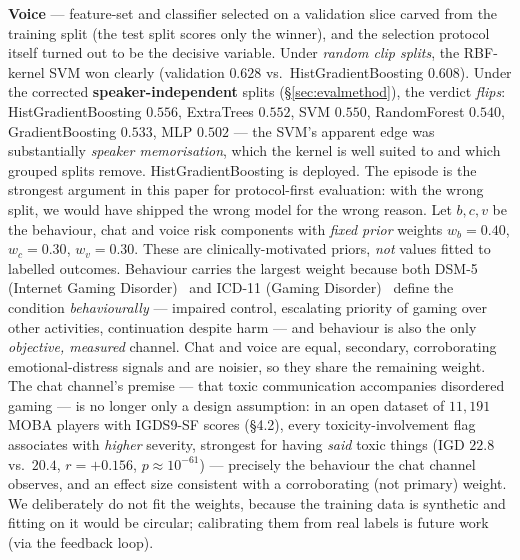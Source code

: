 \documentclass[11pt,a4paper]{article}
\begin{document}
\textbf{Voice} --- feature-set and classifier selected on a validation slice carved
from the training split (the test split scores only the winner), and the selection
protocol itself turned out to be the decisive variable. Under \emph{random clip
splits}, the RBF-kernel SVM won clearly (validation $0.628$ vs.\ HistGradientBoosting
$0.608$). Under the corrected \textbf{speaker-independent} splits
(\S\ref{sec:evalmethod}), the verdict \emph{flips}: HistGradientBoosting $0.556$,
ExtraTrees $0.552$, SVM $0.550$, RandomForest $0.540$, GradientBoosting $0.533$,
MLP $0.502$ --- the SVM's apparent edge was substantially \emph{speaker
memorisation}, which the kernel is well suited to and which grouped splits remove.
HistGradientBoosting is deployed. The episode is the strongest argument in this
paper for protocol-first evaluation: with the wrong split, we would have shipped the
wrong model for the wrong reason.
Let $b,c,v$ be the behaviour, chat and voice risk components with \emph{fixed prior}
weights $w_b{=}0.40$, $w_c{=}0.30$, $w_v{=}0.30$. These are clinically-motivated priors,
\emph{not} values fitted to labelled outcomes. Behaviour carries the largest weight
because both DSM-5 (Internet Gaming Disorder)~\cite{dsm5} and ICD-11 (Gaming
Disorder)~\cite{icd11} define the condition \emph{behaviourally} --- impaired control, escalating priority of gaming over
other activities, continuation despite harm --- and behaviour is also the only
\emph{objective, measured} channel. Chat and voice are equal, secondary, corroborating
emotional-distress signals and are noisier, so they share the remaining weight.
The chat channel's premise --- that toxic communication accompanies disordered
gaming --- is no longer only a design assumption: in an open dataset of $11{,}191$
MOBA players with IGDS9-SF scores (\S4.2), every toxicity-involvement flag
associates with \emph{higher} severity, strongest for having \emph{said} toxic
things (IGD $22.8$ vs.\ $20.4$, $r{=}{+}0.156$, $p{\approx}10^{-61}$) --- precisely
the behaviour the chat channel observes, and an effect size consistent with a
corroborating (not primary) weight. We
deliberately do not fit the weights, because the training data is synthetic and fitting
on it would be circular; calibrating them from real labels is future work (via the
feedback loop).
\end{document}
